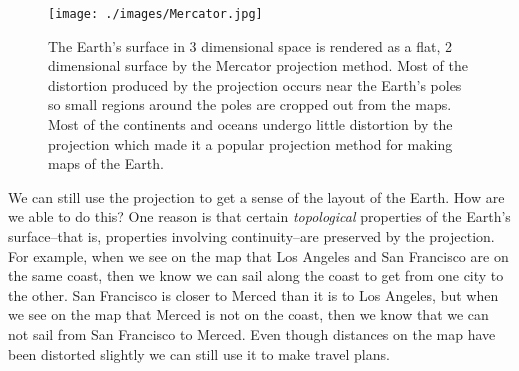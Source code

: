 \begin{figure}[h]
\centering
\texttt{[image: ./images/Mercator.jpg]}
\caption[Scott Hotton's modification of an image from the Cartographic Research Lab at the University of Alabama.]{The Earth's surface in 3 dimensional space is rendered as a flat, 2
dimensional surface by the Mercator projection method. Most of the distortion
produced by the projection occurs near the Earth's poles so small regions 
around the poles are cropped out from the maps. Most of the continents and
oceans undergo little distortion by the projection which made it a popular 
projection method for making maps of the Earth.} 
\label{Mercator}
\end{figure}




   We can still use the projection to get a sense of the layout of the Earth. 
How are we able to do this?  One reason is that certain {\em topological} 
properties of the Earth's surface--that is, properties involving 
continuity--are preserved by the projection. For example, when we see on the 
map that Los Angeles and San Francisco are on the same coast, then we know we 
can sail along the coast to get from one city to the other. San Francisco is
closer to Merced than it is to Los Angeles, but when we see on the map that 
Merced is not on the coast, then we know that we can not sail from San Francisco 
to Merced. Even though distances on the map have been distorted slightly we 
can still use it to make travel plans. 

